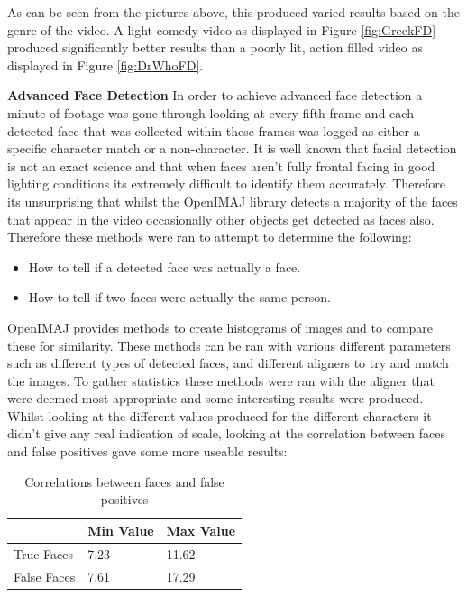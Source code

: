 As can be seen from the pictures above, this produced varied results based on the genre of the video. A light comedy video as displayed in Figure \ref{fig:GreekFD} produced significantly better results than a poorly lit, action filled video as displayed in Figure \ref{fig:DrWhoFD}. 

\textbf{Advanced Face Detection}
\newline
In order to achieve advanced face detection a minute of footage was gone through looking at every fifth frame and each detected face that was collected within these frames was logged as either a specific character match or a non-character. It is well known that facial detection is not an exact science and that when faces aren't fully frontal facing in good lighting conditions its extremely difficult to identify them accurately. Therefore its unsurprising that whilst the OpenIMAJ library detects a majority of the faces that appear in the video occasionally other objects get detected as faces also. Therefore these methods were ran to attempt to determine the following: 

\begin{itemize}
	\item{How to tell if a detected face was actually a face.}
	\item{How to tell if two faces were actually the same person.}
\end{itemize} 

OpenIMAJ provides methods to create histograms of images and to compare these for similarity. These methods can be ran with various different 
parameters such as different types of detected faces, and different aligners to try and match the images. To gather statistics these methods were 
ran with the aligner that were deemed most appropriate and some interesting results were produced. Whilst looking at the different values produced 
for the different characters it didn't give any real indication of scale, looking at the correlation between faces and false positives gave some more 
useable results:

\begin{center}
\begin{table}[ht]
\begin{tabular}{|p{131pt}|p{131pt}|p{131pt}|}
	\hline
	& Min Value & Max Value \\\hline
	True Faces & 7.23 & 11.62 \\\hline
	False Faces & 7.61 & 17.29 \\\hline
\end{tabular}
\caption{Correlations between faces and false positives}
\end{table}
\label{tab:faceFalsePositive} 
\end{center}

